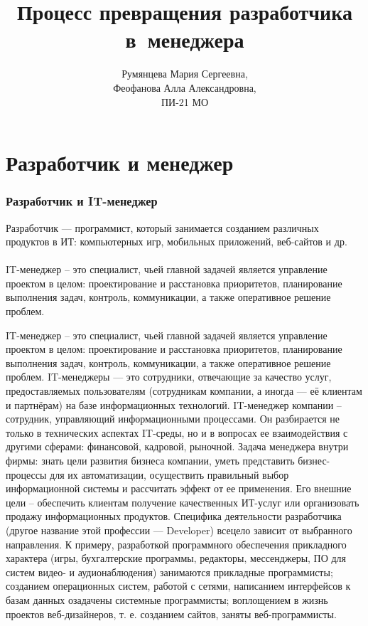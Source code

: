 \documentclass{../industrial-development}
\title{Процесс превращения разработчика в~менеджера}
\author{Румянцева Мария Сергеевна, \\Феофанова Алла Александровна, \\ПИ-21 МО}
\date{}
\begin{document}
\begin{frame}
  \titlepage
\end{frame}

\section{Разработчик и менеджер}

\begin{frame} \frametitle{Разработчик и IT-менеджер}
	\alert{Разработчик} — программист, который занимается созданием различных продуктов в ИТ: компьютерных игр, мобильных приложений, веб-сайтов и др. 	\\
~\\
	\alert{IT-менеджер} – это специалист, чьей главной задачей является управление проектом в целом: проектирование и расстановка приоритетов, планирование выполнения задач, контроль, коммуникации, а также оперативное решение проблем.
\end{frame}
\lecturenotes
IT-менеджер – это специалист, чьей главной задачей является управление проектом в целом: проектирование и расстановка приоритетов, планирование выполнения задач, контроль, коммуникации, а также оперативное решение проблем.
IT-менеджеры — это сотрудники, отвечающие за качество услуг, предоставляемых пользователям (сотрудникам компании, а иногда — её клиентам и партнёрам) на базе информационных технологий.
IT-менеджер компании – сотрудник, управляющий информационными процессами. Он разбирается не только в технических аспектах IT-среды, но и в вопросах ее взаимодействия с другими сферами: финансовой, кадровой, рыночной.  Задача менеджера внутри фирмы: знать цели развития бизнеса компании, уметь представить бизнес-процессы для их автоматизации, осуществить правильный выбор информационной системы и рассчитать эффект от ее применения.  Его внешние цели – обеспечить клиентам получение качественных ИТ-услуг или организовать продажу информационных продуктов.
Специфика деятельности разработчика (другое название этой профессии — Developer) всецело зависит от выбранного направления. К примеру, разработкой программного обеспечения прикладного характера (игры‚ бухгалтерские программы‚ редакторы‚ мессенджеры, ПО для систем видео- и аудионаблюдения) занимаются прикладные программисты; созданием операционных систем, работой с сетями, написанием интерфейсов к базам данных озадачены системные программисты; воплощением в жизнь проектов веб-дизайнеров, т. е. созданием сайтов, заняты веб-программисты.
\end{document}
